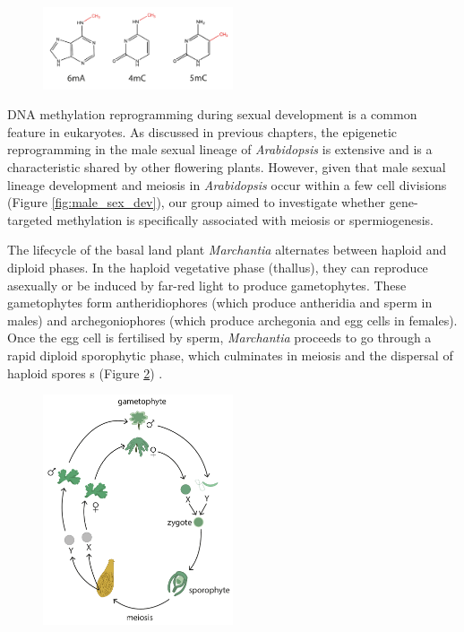 \begin{figure}[htbp!] 
\centering    
    \includegraphics[width=0.5\textwidth]{Chapter3/Figs/Intro/base_mods.pdf}
\caption{}
\label{fig:base_mods}
\captionsetup{font=small}
    \caption*{}
\end{figure}

DNA methylation reprogramming during sexual development is a common feature in eukaryotes. As discussed in previous chapters, the epigenetic reprogramming in the male sexual lineage of \textit{Arabidopsis} is extensive and is a characteristic shared by other flowering plants. However, given that male sexual lineage development and meiosis in \textit{Arabidopsis} occur within a few cell divisions (Figure \ref{fig:male_sex_dev}), our group aimed to investigate whether gene-targeted methylation is specifically associated with meiosis or spermiogenesis.

The lifecycle of the basal land plant \textit{Marchantia} alternates between haploid and diploid phases. In the haploid vegetative phase (thallus), they can reproduce asexually or be induced by far-red light to produce gametophytes. These gametophytes form antheridiophores (which produce antheridia and sperm in males) and archegoniophores (which produce archegonia and egg cells in females). Once the egg cell is fertilised by sperm, \textit{Marchantia} proceeds to go through a rapid diploid sporophytic phase, which culminates in meiosis and the dispersal of haploid spores s (Figure \ref{fig:Mp_lifecycle}) \cite{RN143}.

\begin{figure}[htbp!] 
\centering    
    \includegraphics[width=0.5\textwidth]{Chapter3/Figs/Intro/Marchantia_lifecycle.pdf}
\caption{}
\label{fig:Mp_lifecycle}
\captionsetup{font=small}
    \caption*{}
\end{figure}

